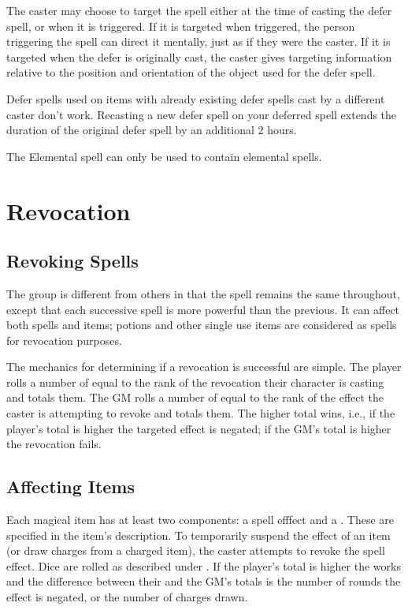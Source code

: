The caster may choose to target the spell either at the time of casting the defer spell, or when it is triggered. If it is targeted when triggered, the person triggering the spell can direct it mentally, just as if they were the caster. If it is targeted when the defer is originally cast, the caster gives targeting information relative to the position and orientation of the object used for the defer spell.

Defer spells used on items with already existing defer spells cast by a different caster don’t work. Recasting a new defer spell on your deferred spell extends the duration of the original defer spell by an additional 2 hours.

The Elemental  spell can only be used to contain elemental spells.
\pagebreak
\section{Revocation}


\subsection{Revoking Spells}
\label{magic-elemental-core-revoking-spells}

The  group is different from others in that the spell remains the same throughout, except that each successive spell is more powerful than the previous. It can affect both spells and items; potions and other single use items are considered as spells for revocation purposes.

The mechanics for determining if a revocation is successful are simple. The player rolls a number of  equal to the rank of the revocation their character is casting and totals them. The GM rolls a number of  equal to the rank of the effect the caster is attempting to revoke and totals them. The higher total wins, i.e., if the player's total is higher the targeted effect is negated; if the GM's total is higher the revocation fails.

\subsection{Affecting Items}

Each magical item has at least two components: a spell efffect and a . These are specified in the item's description. To temporarily suspend the effect of an item (or draw charges from a charged item), the caster attempts to revoke the spell effect. Dice are rolled as described under . If the player’s total is higher the  works and the difference between their and the GM's totals is the number of rounds the effect is negated, or the number of charges drawn.

